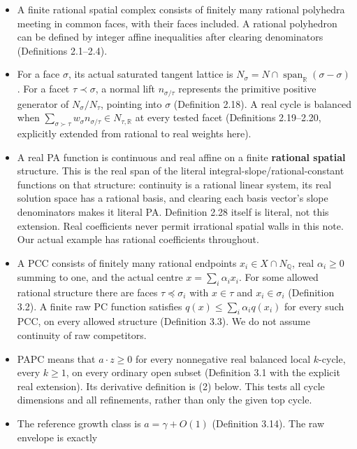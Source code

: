 \documentclass[
  10pt,
]{article}
\providecommand{\tightlist}{%
  \setlength{\itemsep}{0pt}\setlength{\parskip}{0pt}}
\begin{document}
\begin{itemize}
\tightlist
\item
  A finite rational spatial complex consists of finitely many rational
  polyhedra meeting in common faces, with their faces included. A
  rational polyhedron can be defined by integer affine inequalities
  after clearing denominators (Definitions 2.1--2.4).
\item
  For a face \(\sigma\), its actual saturated tangent lattice is
  \(N_\sigma=N\cap\operatorname{span}_{\mathbb R}(\sigma-\sigma)\). For
  a facet \(\tau\prec\sigma\), a normal lift \(n_{\sigma/\tau}\)
  represents the primitive positive generator of \(N_\sigma/N_\tau\),
  pointing into \(\sigma\) (Definition 2.18). A real cycle is balanced
  when
  \(\sum_{\sigma\succ\tau}w_\sigma n_{\sigma/\tau}\in N_{\tau,\mathbb R}\)
  at every tested facet (Definitions 2.19--2.20, explicitly extended
  from rational to real weights here).
\item
  A real PA function is continuous and real affine on a finite
  \textbf{rational spatial} structure. This is the real span of the
  literal integral-slope/rational-constant functions on that structure:
  continuity is a rational linear system, its real solution space has a
  rational basis, and clearing each basis vector's slope denominators
  makes it literal PA. Definition 2.28 itself is literal, not this
  extension. Real coefficients never permit irrational spatial walls in
  this note. Our actual example has rational coefficients throughout.
\item
  A PCC consists of finitely many rational endpoints
  \(x_i\in X\cap N_{\mathbb Q}\), real \(\alpha_i\geq0\) summing to one,
  and the actual centre \(x=\sum_i\alpha_i x_i\). For some allowed
  rational structure there are faces \(\tau\preceq\sigma_i\) with
  \(x\in\tau\) and \(x_i\in\sigma_i\) (Definition 3.2). A finite raw PC
  function satisfies \(q(x)\leq\sum_i\alpha_iq(x_i)\) for every such
  PCC, on every allowed structure (Definition 3.3). We do not assume
  continuity of raw competitors.
\item
  PAPC means that \(a\cdot z\geq0\) for every nonnegative real balanced
  local \(k\)-cycle, every \(k\geq1\), on every ordinary open subset
  (Definition 3.1 with the explicit real extension). Its derivative
  definition is (2) below. This tests all cycle dimensions and all
  refinements, rather than only the given top cycle.
\item
  The reference growth class is \(a=\gamma+O(1)\) (Definition 3.14). The
  raw envelope is exactly \[
\]
\end{itemize}
\end{document}
